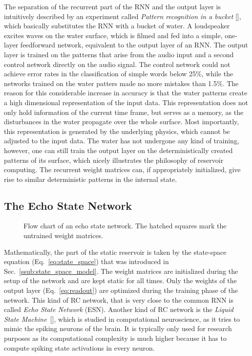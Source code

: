 The separation of the recurrent part of the RNN and the output layer is
intuitively described by an experiment called \emph{Pattern recognition in a
bucket} [\cite{Fernando2003PatternRI}], which basically substitutes the RNN with
a bucket of water.  A loudspeaker excites waves on the water surface, which is
filmed and fed into a simple, one-layer feedforward network, equivalent to the
output layer of an RNN.  The output layer is trained on the patterns that arise
from the audio input and a second control network directly on the audio signal.
The control network could not achieve error rates in the classification of
simple words below 25\%, while the networks trained on the water patters made
no more mistakes than 1.5\%.  The reason for this considerable increase in
accuracy is that the water patterns create a high dimensional representation of
the input data.  This representation does not only hold information of the
current time frame, but serves as a memory, as the disturbances in the water
propagate over the whole surface.  Most importantly, this representation is
generated by the underlying physics, which cannot be adjusted to the input
data.  The water has not undergone any kind of training, however, one can still
train the output layer on the deterministically created patterns of its
surface, which nicely illustrates the philosophy of reservoir computing.  The
recurrent weight matrices can, if appropriately initialized, give rise to
similar deterministic patterns in the internal state.


\subsection{The Echo State Network}%
\label{sub:the_echo_state_network}

\begin{figure}
  \centering
  \ESNFlowChart
  \caption{Flow chart of an echo state network. The hatched squares mark the
    untrained weight matrices.}
  \label{fig:esn_flow_chart}
\end{figure}

Mathematically, the part of the static reservoir is taken by the state-space
equation (Eq.~\ref{eq:state_space}) that was introduced in
Sec.~\ref{ssub:state_space_model}.  The weight matrices are initialized during
the setup of the network and are kept static for all times.  Only the weights
of the output layer (Eq.~\ref{eq:readout}) are optimized during the training
phase of the network. This kind of RC network, that is very close to the common
RNN is called \emph{Echo State Network} (ESN). Another kind of RC network is
the \emph{Liquid State Machine}~[\cite{maass2004}], which is studied in
computational neuroscience, as it tries to mimic the spiking neurons of the
brain. It is typically only used for research purposes as its computational
complexity is much higher because it has to compute spiking state activations
in every neuron.

